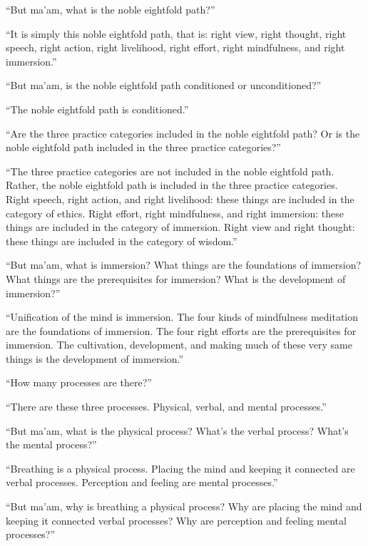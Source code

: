\documentclass[12pt,openany]{book}%
\begin{document}
“But ma’am, what is the noble eightfold path?” 

“It is simply this noble eightfold path, that is: right view, right thought, right speech, right action, right livelihood, right effort, right mindfulness, and right immersion.” 

“But ma’am, is the noble eightfold path conditioned or unconditioned?” 

“The noble eightfold path is conditioned.” 

“Are the three practice categories included in the noble eightfold path? Or is the noble eightfold path included in the three practice categories?” 

“The three practice categories are not included in the noble eightfold path. Rather, the noble eightfold path is included in the three practice categories. Right speech, right action, and right livelihood: these things are included in the category of ethics. Right effort, right mindfulness, and right immersion: these things are included in the category of immersion. Right view and right thought: these things are included in the category of wisdom.” 

“But ma’am, what is immersion? What things are the foundations of immersion? What things are the prerequisites for immersion? What is the development of immersion?” 

“Unification of the mind is immersion. The four kinds of mindfulness meditation are the foundations of immersion. The four right efforts are the prerequisites for immersion. The cultivation, development, and making much of these very same things is the development of immersion.” 

“How many processes are there?” 

“There are these three processes. Physical, verbal, and mental processes.” 

“But ma’am, what is the physical process? What’s the verbal process? What’s the mental process?” 

“Breathing is a physical process. Placing the mind and keeping it connected are verbal processes. Perception and feeling are mental processes.” 

“But ma’am, why is breathing a physical process? Why are placing the mind and keeping it connected verbal processes? Why are perception and feeling mental processes?” 
\end{document}
